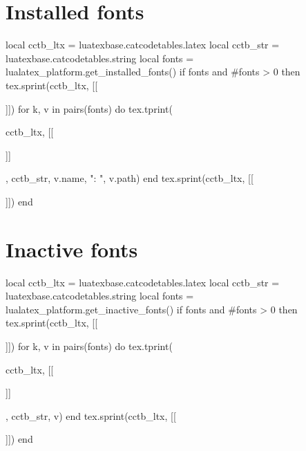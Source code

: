 \documentclass{article}
\begin{document}
\section{Installed fonts}

\begin{luacode*}
  local cctb_ltx = luatexbase.catcodetables.latex
  local cctb_str = luatexbase.catcodetables.string
  local fonts = lualatex_platform.get_installed_fonts()
  if fonts and #fonts > 0 then
     tex.sprint(cctb_ltx, [[\begin{itemize}]])
       for k, v in pairs(fonts) do
          tex.tprint({cctb_ltx, [[\item\relax]]}, {cctb_str, v.name, ": ", v.path})
       end
     tex.sprint(cctb_ltx, [[\end{itemize}]])
  end
\end{luacode*}

\section{Inactive fonts}

\begin{luacode*}
  local cctb_ltx = luatexbase.catcodetables.latex
  local cctb_str = luatexbase.catcodetables.string
  local fonts = lualatex_platform.get_inactive_fonts()
  if fonts and #fonts > 0 then
     tex.sprint(cctb_ltx, [[\begin{itemize}]])
       for k, v in pairs(fonts) do
          tex.tprint({cctb_ltx, [[\item\relax]]}, {cctb_str, v})
       end
    tex.sprint(cctb_ltx, [[\end{itemize}]])
  end
\end{luacode*}
\end{document}
